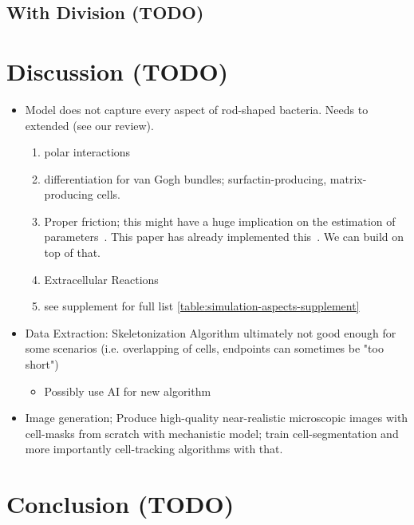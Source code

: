 \documentclass{article}
\begin{document}
\subsection{With Division (TODO)}

\section{Discussion (TODO)}
\label{section:discussion}

\begin{itemize}
    \item Model does not capture every aspect of rod-shaped bacteria. Needs to extended (see our
        review).
    \begin{enumerate}
        \item polar interactions
        \item differentiation for van Gogh bundles; surfactin-producing, matrix-producing cells.
        \item Proper friction; this might have a huge implication on the estimation of
            parameters~\cite{Grant2014}.
            This paper has already implemented this~\cite{Doumic2020}.
            We can build on top of that.
        \item Extracellular Reactions~\cite{Li2025}
        \item see supplement for full list \ref{table:simulation-aspects-supplement}
    \end{enumerate}
    \item Data Extraction: Skeletonization Algorithm ultimately not good enough for some scenarios
        (i.e. overlapping of cells, endpoints can sometimes be "too short")
    \begin{itemize}
        \item Possibly use AI for new algorithm
    \end{itemize}
    \item Image generation; Produce high-quality near-realistic microscopic images with cell-masks
        from scratch with mechanistic model; train cell-segmentation and more importantly
        cell-tracking algorithms with that.
\end{itemize}

\section{Conclusion (TODO)}
\label{section:conclusion}
\end{document}
